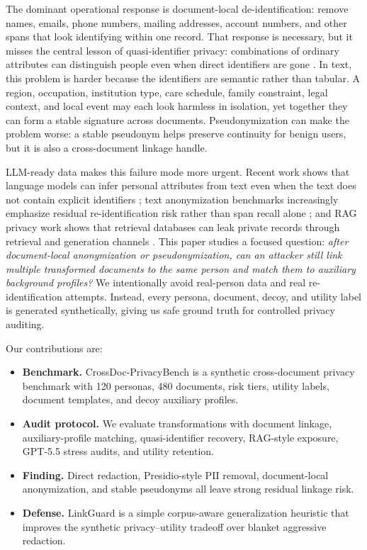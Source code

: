 \documentclass{article}
\newcommand{\method}{LinkGuard}
\newcommand{\bench}{CrossDoc-PrivacyBench}
\begin{document}
The dominant operational response is document-local de-identification: remove names, emails, phone numbers, mailing addresses, account numbers, and other spans that look identifying within one record.
That response is necessary, but it misses the central lesson of quasi-identifier privacy: combinations of ordinary attributes can distinguish people even when direct identifiers are gone \citep{sweeney2002,narayanan2008,cohen2022attacks}.
In text, this problem is harder because the identifiers are semantic rather than tabular.
A region, occupation, institution type, care schedule, family constraint, legal context, and local event may each look harmless in isolation, yet together they can form a stable signature across documents.
Pseudonymization can make the problem worse: a stable pseudonym helps preserve continuity for benign users, but it is also a cross-document linkage handle.

LLM-ready data makes this failure mode more urgent.
Recent work shows that language models can infer personal attributes from text even when the text does not contain explicit identifiers \citep{staab2024beyond}; text anonymization benchmarks increasingly emphasize residual re-identification risk rather than span recall alone \citep{pilan2022tab,krco2026ratbench}; and RAG privacy work shows that retrieval databases can leak private records through retrieval and generation channels \citep{zeng2024ragprivacy,jiang2024ragthief}.
This paper studies a focused question: \emph{after document-local anonymization or pseudonymization, can an attacker still link multiple transformed documents to the same person and match them to auxiliary background profiles?}
We intentionally avoid real-person data and real re-identification attempts.
Instead, every persona, document, decoy, and utility label is generated synthetically, giving us safe ground truth for controlled privacy auditing.

Our contributions are:
\begin{itemize}
    \setlength{\itemsep}{0pt}
    \setlength{\parsep}{0pt}
    \setlength{\topsep}{2pt}
    \item \textbf{Benchmark.} \bench{} is a synthetic cross-document privacy benchmark with 120 personas, 480 documents, risk tiers, utility labels, document templates, and decoy auxiliary profiles.
    \item \textbf{Audit protocol.} We evaluate transformations with document linkage, auxiliary-profile matching, quasi-identifier recovery, RAG-style exposure, GPT-5.5 stress audits, and utility retention.
    \item \textbf{Finding.} Direct redaction, Presidio-style PII removal, document-local anonymization, and stable pseudonyms all leave strong residual linkage risk.
    \item \textbf{Defense.} \method{} is a simple corpus-aware generalization heuristic that improves the synthetic privacy--utility tradeoff over blanket aggressive redaction.
\end{itemize}
\end{document}
